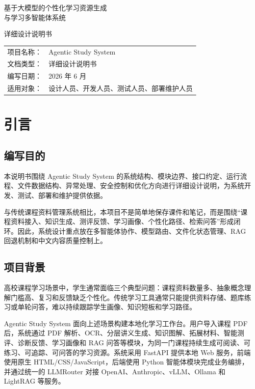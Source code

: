 \documentclass[UTF8,fontset=windows,zihao=-4,openany]{ctexrep}
\begin{document}
\begin{titlepage}
  \centering
  \vspace*{2.0cm}
  {\heiti 基于大模型的个性化学习资源生成\\[0.4em]与学习多智能体系统\par}
  \vspace{1.5cm}
  {\heiti 详细设计说明书\par}
  \vspace{3.0cm}
  \begin{tabular}{rl}
    项目名称： & Agentic Study System\\
    文档类型： & 详细设计说明书\\
    编写日期： & 2026 年 6 月\\
    适用对象： & 设计人员、开发人员、测试人员、部署维护人员\\
  \end{tabular}
\end{titlepage}

\tableofcontents
\clearpage
{}

\chapter{引言}

\section{编写目的}

本说明书围绕 Agentic Study System 的系统结构、模块边界、接口约定、运行流程、文件数据结构、异常处理、安全控制和优化方向进行详细设计说明，为系统开发、测试、部署和维护提供依据。

与传统课程资料管理系统相比，本项目不是简单地保存课件和笔记，而是围绕“课程资料接入、知识生成、测评反馈、学习画像、个性化路径、检索问答”形成闭环。因此，系统设计重点放在多智能体协作、模型路由、文件化状态管理、RAG 回退机制和中文内容质量控制上。

\section{项目背景}

高校课程学习场景中，学生通常面临三个典型问题：课程资料数量多、抽象概念理解门槛高、复习和反馈缺乏个性化。传统学习工具通常只能提供资料存储、题库练习或单轮问答，难以持续跟踪学生画像、知识短板和学习路径。

Agentic Study System 面向上述场景构建本地化学习工作台。用户导入课程 PDF 后，系统通过 PDF 解析、OCR、分层讲义生成、知识图解、拓展材料、智能测评、诊断反馈、学习画像和 RAG 问答等模块，为同一门课程持续生成可阅读、可练习、可追踪、可问答的学习资源。系统采用 FastAPI 提供本地 Web 服务，前端使用原生 HTML/CSS/JavaScript，后端使用 Python 智能体模块完成业务编排，并通过统一的 LLMRouter 对接 OpenAI、Anthropic、vLLM、Ollama 和 LightRAG 等服务。
\end{document}
